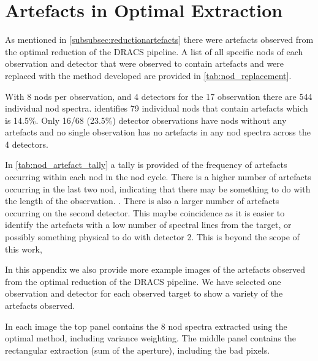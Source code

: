 
\chapter{Artefacts in Optimal Extraction}
\label{appendix:artefacts}





As mentioned in \cref{subsubsec:reductionartefacts} there were artefacts observed from the optimal reduction of the {DRACS} pipeline.
A list of all specific nods of each observation and detector that were observed to contain artefacts and were replaced with the method developed are provided in \cref{tab:nod_replacement}.

With 8 nods per observation, and 4 detectors for the 17 observation there are 544 individual nod spectra.  identifies 79 individual nods that contain artefacts which is 14.5\%.
Only 16/68 (23.5\%) detector observations have nods without any artefacts and no single observation has no artefacts in any nod spectra across the 4 detectors.

In \cref{tab:nod_artefact_tally} a tally is provided of the frequency of artefacts occurring within each nod in the nod cycle.
There is a higher number of artefacts occurring in the last two nod, indicating that there may be something to do with the length of the observation. .
There is also a larger number of artefacts occurring on the second detector.
This maybe coincidence as it is easier to identify the artefacts with a low number of spectral lines from the target, or possibly something physical to do with detector 2.
This is beyond the scope of this work, 

In this appendix we also provide more example images of the artefacts observed from the optimal reduction of the {DRACS} pipeline.
We have selected one observation and detector for each observed target to show a variety of the artefacts observed.

In each image the top panel contains the 8 nod spectra extracted using the optimal method, including variance weighting.
The middle panel contains the rectangular extraction (sum of the aperture), including the bad pixels.

